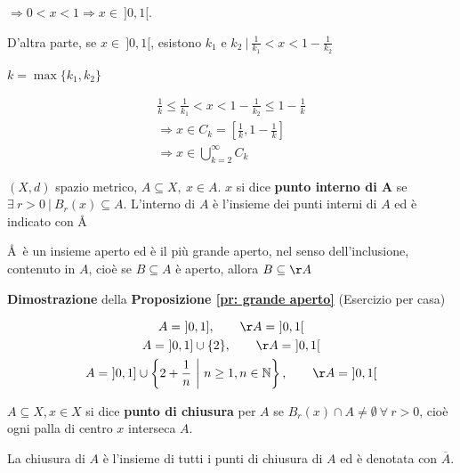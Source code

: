 $\Rightarrow 0 < x < 1 \Rightarrow x \in \ ]0,1[.$

D'altra parte, se $x \in \ ]0,1[$, esistono $k_1$ e $k_2 \ \big| \ \frac{1}{k_1} < x<1 - \frac{1}{k_2}$

$k=\max\{k_1, k_2\}$ 

\begin{gather*}
	\frac{1}{k} \leq \frac{1}{k_1} < x < 1 - \frac{1}{k_2} \leq 1 - \frac{1}{k}
	\\
	\Rightarrow x \in C_k = \left[ \frac{1}{k}, 1 - \frac{1}{k} \right]
	\\
	\Rightarrow x \in \bigcup_{k=2}^{\infty} C_k
\end{gather*}


\begin{definition}
	
	$(X,d)$ spazio metrico, $A \subseteq X, \ x \in A$. $x$ si dice \textbf{punto interno di A} se $\exists \ r > 0 \ \big| \ B_r(x) \subseteq A$. L'interno di $A$ è l'insieme dei punti interni di $A$ ed è indicato con \AA
\end{definition}


\begin{proposition}
	\label{pr: grande aperto}
	\AA \ è un insieme aperto ed è il più grande aperto, nel senso dell'inclusione, contenuto in $A$, cioè se $B \subseteq A$ è aperto, allora $B \subseteq \AA$
\end{proposition}

\begin{dembar}
	\textbf{Dimostrazione} della \textbf{Proposizione \ref{pr: grande aperto}} (Esercizio per casa)
\end{dembar}


\begin{exbar}
	\begin{gather*}
		A = \ ]0,1], \qquad \AA = \ ]0,1[
		\\
		A = \ ]0,1] \cup \{ 2 \}, \qquad \AA = \ ]0,1[
		\\
		A = \ ]0,1] \cup \left\{2 + \frac{1}{n} \ \bigg| \ n \geq 1, n \in \mathbb{N} \right\}, \qquad \AA = \ ]0,1[
	\end{gather*}
\end{exbar}


\begin{definition}
	$A \subseteq X, x \in X$ si dice \textbf{punto di chiusura} per $A$ se $B_r(x) \cap A \neq \emptyset \ \forall \ r > 0$, cioè ogni palla di centro $x$ interseca $A$. 
	
	La chiusura di $A$ è l'insieme di tutti i punti di chiusura di $A$ ed è denotata con $\overline{A}$.
\end{definition}


